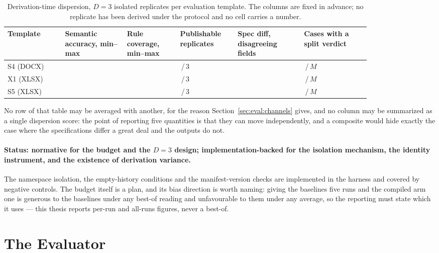\begin{table}[htbp]
\centering
\small
\caption{Derivation-time dispersion, $D=3$ isolated replicates per evaluation template. The
columns are fixed in advance; no replicate has been derived under the protocol and no cell
carries a number.}
\label{tab:eval:derivationdispersion}
\begin{tabular}{p{0.135\linewidth}p{0.145\linewidth}p{0.125\linewidth}p{0.125\linewidth}p{0.15\linewidth}p{0.155\linewidth}}
\hline
\textbf{Template} & \textbf{Semantic accuracy, min--max} & \textbf{Rule coverage, min--max} &
\textbf{Publishable replicates} & \textbf{Spec diff, disagreeing fields} &
\textbf{Cases with a split verdict} \\
\hline
S4 (DOCX) & & & \,/\,3 & & \,/\,$M$ \\
X1 (XLSX) & & & \,/\,3 & & \,/\,$M$ \\
S5 (XLSX) & & & \,/\,3 & & \,/\,$M$ \\
\hline
\end{tabular}
\end{table}

No row of that table may be averaged with another, for the reason
Section~\ref{sec:eval:channels} gives, and no column may be summarized as a single dispersion
score: the point of reporting five quantities is that they can move independently, and a
composite would hide exactly the case where the specifications differ a great deal and the
outputs do not.

\paragraph{Status: normative for the budget and the $D=3$ design; implementation-backed for
the isolation mechanism, the identity instrument, and the existence of derivation variance.}
The namespace isolation, the empty-history conditions and the manifest-version checks are
implemented in the harness and covered by negative controls. The budget itself is a plan, and
its bias direction is worth naming: giving the baselines five runs and the compiled arm one is
generous to the baselines under any best-of reading and unfavourable to them under any average,
so the reporting must state which it uses --- this thesis reports per-run and all-runs figures,
never a best-of.

\section{The Evaluator}
\label{sec:eval:evaluator}

